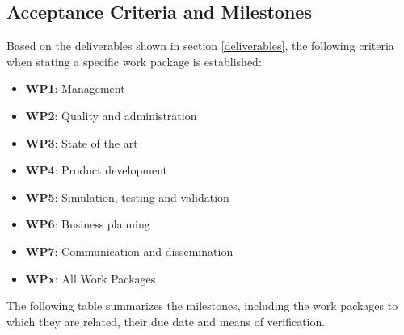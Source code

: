 \subsection{Acceptance Criteria and Milestones}


Based on the deliverables shown in section \ref{deliverables}, the following criteria when stating a specific work package is established:
\begin{itemize} 	
	\item \textbf{WP1}: Management 
	\item \textbf{WP2}: Quality and administration
	\item \textbf{WP3}: State of the art
	\item \textbf{WP4}: Product development
	\item \textbf{WP5}: Simulation, testing and validation
	\item \textbf{WP6}: Business planning
	\item \textbf{WP7}: Communication and dissemination
	\item \textbf{WPx}: All Work Packages
\end{itemize}

The following table summarizes the milestones, including the work packages to which they are related, their due date and means of verification.

